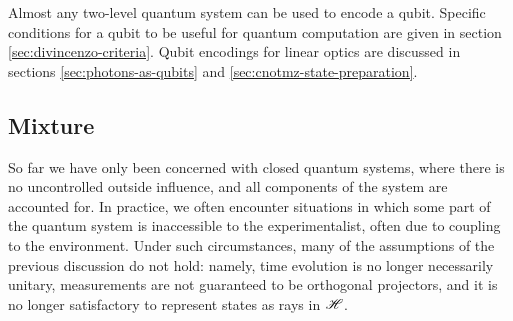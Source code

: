 Almost any two-level quantum system can be used to encode a qubit. Specific conditions for a qubit to be useful for quantum computation are given in section \ref{sec:divincenzo-criteria}. Qubit encodings for linear optics are discussed in sections \ref{sec:photons-as-qubits} and \ref{sec:cnotmz-state-preparation}.

\subsection{Mixture}
\label{sec:background-mixture}
So far we have only been concerned with closed quantum systems, where there is no uncontrolled outside influence, and all components of the system are accounted for. In practice, we often encounter situations in which some part of the quantum system is inaccessible to the experimentalist, often due to coupling to the environment. Under such circumstances, many of the assumptions of the previous discussion do not hold: namely, time evolution is no longer necessarily unitary, measurements are not guaranteed to be orthogonal projectors, and it is no longer satisfactory to represent states as rays in $\mathscr{H}$.

